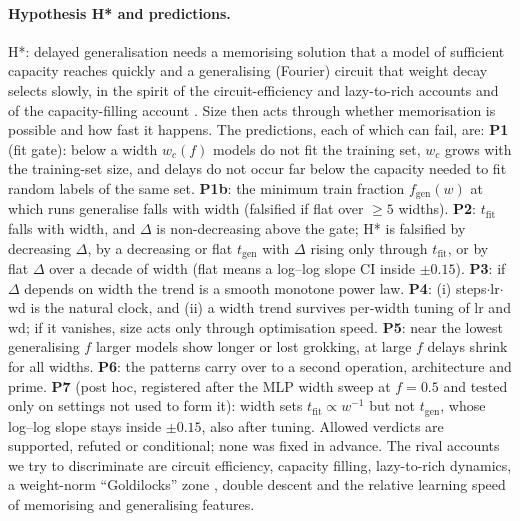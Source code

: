 \documentclass{article}
\begin{document}
\paragraph{Hypothesis H* and predictions.} H*: delayed generalisation needs a memorising solution that a model of sufficient capacity reaches quickly and a generalising (Fourier) circuit that weight decay selects slowly, in the spirit of the circuit-efficiency and lazy-to-rich accounts \citep{varma2023explaining,kumar2024grokking} and of the capacity-filling account \citep{morris2025memorize}. Size then acts through whether memorisation is possible and how fast it happens. The predictions, each of which can fail, are:
\textbf{P1} (fit gate): below a width $w_c(f)$ models do not fit the training set, $w_c$ grows with the training-set size, and delays do not occur far below the capacity needed to fit random labels of the same set. \textbf{P1b}: the minimum train fraction $f_{\mathrm{gen}}(w)$ at which runs generalise falls with width (falsified if flat over $\ge5$ widths). \textbf{P2}: $t_{\mathrm{fit}}$ falls with width, and $\Delta$ is non-decreasing above the gate; H* is falsified by decreasing $\Delta$, by a decreasing or flat $t_{\mathrm{gen}}$ with $\Delta$ rising only through $t_{\mathrm{fit}}$, or by flat $\Delta$ over a decade of width (flat means a log--log slope CI inside $\pm0.15$). \textbf{P3}: if $\Delta$ depends on width the trend is a smooth monotone power law. \textbf{P4}: (i) steps$\cdot$lr$\cdot$wd is the natural clock, and (ii) a width trend survives per-width tuning of lr and wd; if it vanishes, size acts only through optimisation speed. \textbf{P5}: near the lowest generalising $f$ larger models show longer or lost grokking, at large $f$ delays shrink for all widths. \textbf{P6}: the patterns carry over to a second operation, architecture and prime. \textbf{P7} (post hoc, registered after the MLP width sweep at $f=0.5$ and tested only on settings not used to form it): width sets $t_{\mathrm{fit}}\propto w^{-1}$ but not $t_{\mathrm{gen}}$, whose log--log slope stays inside $\pm0.15$, also after tuning.
Allowed verdicts are supported, refuted or conditional; none was fixed in advance. The rival accounts we try to discriminate are circuit efficiency, capacity filling, lazy-to-rich dynamics, a weight-norm ``Goldilocks'' zone \citep{liu2023omnigrok}, double descent \citep{davies2023unifying,nakkiran2020deep} and the relative learning speed of memorising and generalising features.
\end{document}
